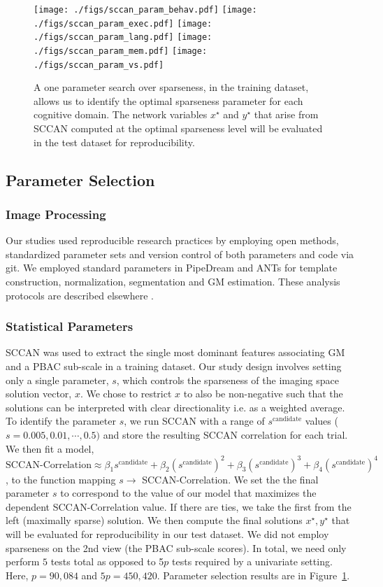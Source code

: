 \documentclass[preprint,authoryear,12pt]{elsarticle}
\begin{document}
\begin{figure}[th] \centering
\texttt{[image: ./figs/sccan\_param\_behav.pdf]}
\texttt{[image: ./figs/sccan\_param\_exec.pdf]}
\texttt{[image: ./figs/sccan\_param\_lang.pdf]}
\texttt{[image: ./figs/sccan\_param\_mem.pdf]}
\texttt{[image: ./figs/sccan\_param\_vs.pdf]}
\caption{A one parameter search over sparseness, in the training dataset, allows us to identify the optimal sparseness parameter for each cognitive domain.  The network variables $x^\star$ and $y^\star$ that arise from SCCAN computed at the optimal sparseness level will be evaluated in the test dataset for reproducibility.}
\label{fig:param}
\end{figure}

\subsection{Parameter Selection}  
\subsubsection{Image Processing}
Our studies used reproducible research practices by employing open methods, standardized parameter sets and version control of both parameters and code via git.  We employed standard parameters in PipeDream and ANTs for template construction, normalization, segmentation and GM estimation.  These analysis protocols are described elsewhere \citet{Avants2011a,Avants2011,Tustison2012,Tustison2010}. 

\subsubsection{Statistical Parameters}
SCCAN was used to extract the single most dominant features associating GM and a PBAC sub-scale in a training dataset.  Our study design involves setting only a single parameter, $s$, which controls the sparseness of the imaging space solution vector, $x$.  We chose to restrict $x$ to also be non-negative such that the solutions can be interpreted with clear directionality i.e. as a weighted average.  To identify the parameter $s$, we run SCCAN with a range of $s^{\text{candidate}}$ values ($s=0.005,0.01,\cdots,0.5)$ and store the resulting SCCAN correlation for each trial.  We then fit a model, $ \text{SCCAN-Correlation} \approx   \beta_1 s^{\text{candidate}} + \beta_2 ( s^{\text{candidate}} )^2 +  \beta_3 ( s^{\text{candidate}} )^3 + \beta_4 ( s^{\text{candidate}} )^4$, to the function mapping $s \to $ SCCAN-Correlation.  We set the the final parameter $s$ to correspond to the value of our model that maximizes the dependent SCCAN-Correlation value.  If there are ties, we take the first from the left (maximally sparse) solution.   We then compute the final solutions $x^\star, y^\star$ that will be evaluated for reproducibility in our test dataset.  We did not employ sparseness on the 2nd view (the PBAC sub-scale scores).  In total, we need only perform $5$ tests total as opposed to 5$p$ tests required by a univariate setting.  Here, $p=90,084$ and $5p=450,420$.  Parameter selection results are in Figure~\ref{fig:param}.
\end{document}

